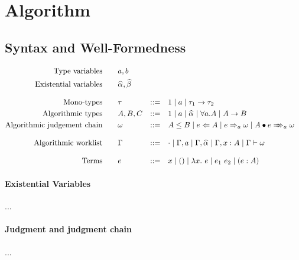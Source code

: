 \section{Algorithm}

\subsection{Syntax and Well-Formedness}

$$\begin{aligned}
\text{Type variables}\qquad&a, b\\
\text{Existential variables}\qquad&\al, \bt\\[3mm]
\text{Mono-types}\qquad&\tau &::=&\quad 1 \mid a \mid \tau_1\to \tau_2\\
\text{Algorithmic types}\qquad&A, B, C &::=&\quad 1 \mid a \mid \al \mid \forall a. A \mid A\to B\\
\text{Algorithmic judgement chain}\qquad&\jg &::=&\quad A \le B \mid e\Lto A \mid e\To_{a} \jg \mid \appInfAlg{A}{e}\\[3mm]
\text{Algorithmic worklist}\qquad&\Gm &::=&\quad \cdot \mid \Gm, a \mid \Gm, \al \mid \Gm, x: A \mid \Gm \vdash \jg\\[3mm]
\text{Terms}\qquad&e&::=&\quad x \mid () \mid \lam{e} \mid e_1~e_2 \mid (e:A)
\end{aligned}$$

\paragraph{Existential Variables} ...

\paragraph{Judgment and judgment chain} ...
